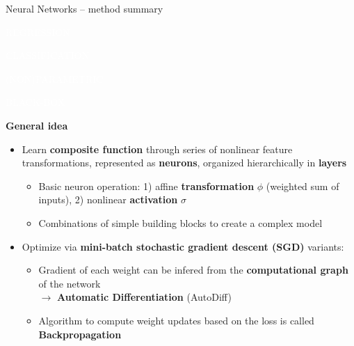 \documentclass[11pt,compress,t,notes=noshow, xcolor=table]{beamer}
\newcommand{\highlight}[1]{\textcolor{hlcol}{\textbf{#1}}}
\newcommand{\maketag}[2][100]{
  \colorbox{hlcol!#1}{\textcolor{white}{\MakeUppercase{\scriptsize #2}} 
  \vphantom{}}
}
\begin{document}
\begin{frame2}{Neural Networks -- method summary}

  \maketag{regression} \maketag{classification}
  \maketag[50]{(non)parametric}
  \maketag{BLACK-BOX} %
  

  
  \highlight{General idea}
  \begin{itemize}
    \item Learn \textbf{composite function} through series of nonlinear feature 
    transformations, represented as \textbf{neurons}, organized hierarchically 
    in \textbf{layers}
    \begin{itemize}
      \item Basic neuron operation: 1) affine \textbf{transformation} $\phi$ (weighted sum of inputs), 
      2) nonlinear \textbf{activation} $\sigma$
      \item Combinations of simple building 
      blocks to create a complex model
    \end{itemize}
    \item Optimize via \textbf{mini-batch stochastic gradient descent (SGD)} variants:
    \begin{itemize}
      \item Gradient of each weight can be infered from the \textbf{computational graph} of the network\\
      $\rightarrow$ \textbf{Automatic Differentiation} (AutoDiff)
      \item Algorithm to compute weight updates based on the loss is called \textbf{Backpropagation}
    \end{itemize}
  \end{itemize}
  
\end{frame2}
\end{document}
